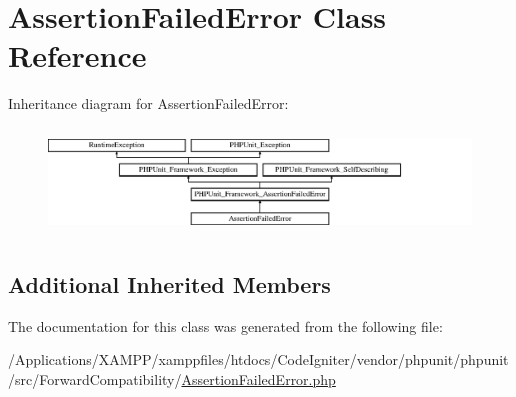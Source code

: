 \hypertarget{class_p_h_p_unit_1_1_framework_1_1_assertion_failed_error}{}\section{Assertion\+Failed\+Error Class Reference}
\label{class_p_h_p_unit_1_1_framework_1_1_assertion_failed_error}
Inheritance diagram for Assertion\+Failed\+Error\+:\begin{figure}[H]
\begin{center}
\leavevmode
\includegraphics[height=2.860792cm]{class_p_h_p_unit_1_1_framework_1_1_assertion_failed_error}
\end{center}
\end{figure}
\subsection*{Additional Inherited Members}


The documentation for this class was generated from the following file\+:\begin{DoxyCompactItemize}
\item 
/\+Applications/\+X\+A\+M\+P\+P/xamppfiles/htdocs/\+Code\+Igniter/vendor/phpunit/phpunit/src/\+Forward\+Compatibility/\mbox{\hyperlink{_forward_compatibility_2_assertion_failed_error_8php}{Assertion\+Failed\+Error.\+php}}\end{DoxyCompactItemize}
